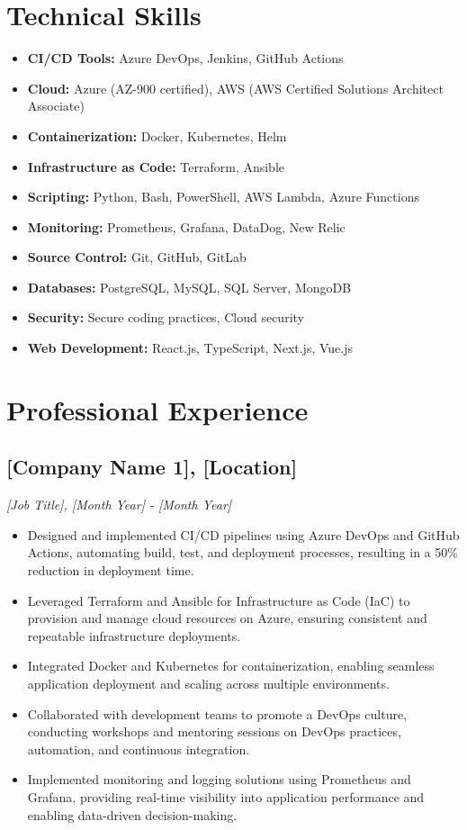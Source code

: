 \documentclass[a4paper,10pt]{article}
\begin{document}
\section*{Technical Skills}
\begin{itemize}[noitemsep]
\item \textbf{CI/CD Tools:} Azure DevOps, Jenkins, GitHub Actions
\item \textbf{Cloud:} Azure (AZ-900 certified), AWS (AWS Certified Solutions Architect Associate)
\item \textbf{Containerization:} Docker, Kubernetes, Helm
\item \textbf{Infrastructure as Code:} Terraform, Ansible
\item \textbf{Scripting:} Python, Bash, PowerShell, AWS Lambda, Azure Functions
\item \textbf{Monitoring:} Prometheus, Grafana, DataDog, New Relic
\item \textbf{Source Control:} Git, GitHub, GitLab
\item \textbf{Databases:} PostgreSQL, MySQL, SQL Server, MongoDB
\item \textbf{Security:} Secure coding practices, Cloud security
\item \textbf{Web Development:} React.js, TypeScript, Next.js, Vue.js
\end{itemize}

\section*{Professional Experience}
\subsection*{[Company Name 1], [Location]}
\textit{[Job Title], [Month Year] - [Month Year]}
\begin{itemize}[noitemsep]
\item Designed and implemented CI/CD pipelines using Azure DevOps and GitHub Actions, automating build, test, and deployment processes, resulting in a 50\% reduction in deployment time.
\item Leveraged Terraform and Ansible for Infrastructure as Code (IaC) to provision and manage cloud resources on Azure, ensuring consistent and repeatable infrastructure deployments.
\item Integrated Docker and Kubernetes for containerization, enabling seamless application deployment and scaling across multiple environments.
\item Collaborated with development teams to promote a DevOps culture, conducting workshops and mentoring sessions on DevOps practices, automation, and continuous integration.
\item Implemented monitoring and logging solutions using Prometheus and Grafana, providing real-time visibility into application performance and enabling data-driven decision-making.
\end{itemize}
\end{document}
